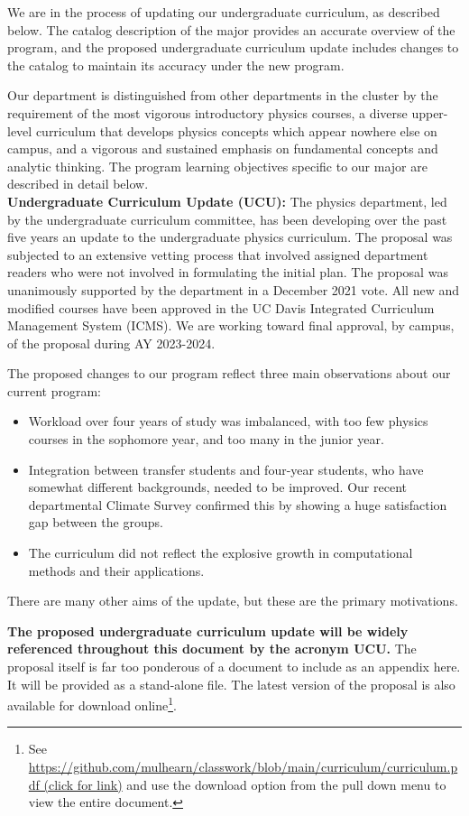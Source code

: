 \documentclass[12pt]{article}
\begin{document}
We are in the process of updating our undergraduate curriculum, as
described below.  The catalog description of the major provides an
accurate overview of the program, and the proposed undergraduate
curriculum update includes changes to the catalog to maintain its
accuracy under the new program.

Our department is distinguished from other departments in the cluster
by the requirement of the most vigorous introductory physics courses,
a diverse upper-level curriculum that develops physics concepts which
appear nowhere else on campus, and a vigorous and sustained emphasis
on fundamental concepts and analytic thinking.  The program learning
objectives specific to our major are described in detail below.\\[3pt]

\noindent
{\bf Undergraduate Curriculum Update (UCU):}
The physics department, led by the undergraduate curriculum committee,
has been developing over the past five years an update to the
undergraduate physics curriculum.  The proposal was subjected to an
extensive vetting process that involved assigned department readers
who were not involved in formulating the initial plan.  The proposal
was unanimously supported by the department in a December 2021 vote.
All new and modified courses have been approved in the UC Davis
Integrated Curriculum Management System (ICMS).  We are working toward
final approval, by campus, of the proposal during AY 2023-2024.

The proposed changes to our program reflect three main observations about our current program: 
\begin{itemize}
 \item Workload over four years of study was imbalanced, with too few physics
courses in the sophomore year, and too many in the junior year. 
 \item Integration between transfer students and
four-year students, who have somewhat different backgrounds, needed to be
improved. Our recent departmental Climate Survey confirmed this by showing a
huge satisfaction gap between the groups. 
 \item  The curriculum did not reflect the explosive growth
in computational methods and their applications.
\end{itemize}
There are many other aims of the update, but these are the primary motivations.

{\bf The proposed undergraduate curriculum update will be widely
  referenced throughout this document by the acronym UCU.}  The
proposal itself is far too ponderous of a document to include as an
appendix here.  It will be provided as a stand-alone file.
The latest version of the proposal is also available for download
online\footnote{See
  \href{https://github.com/mulhearn/classwork/blob/main/curriculum/curriculum.pdf}{https://github.com/mulhearn/classwork/blob/main/curriculum/curriculum.pdf (click for link)}
  and use the download option from the pull down menu to view the entire document.}.\\[3pt]
\end{document}
